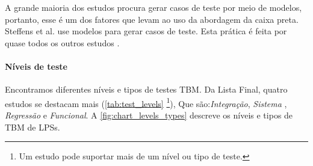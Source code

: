 A grande maioria dos estudos procura gerar casos de teste por meio de modelos, portanto, esse é um dos fatores que levam ao uso da abordagem da caixa preta. Steffens et al. \cite{Steffens_et_al2012} use modelos para gerar casos de teste. Esta prática é feita por quase todos os outros estudos \cite{cichos2011model, oster2011pairwise, samih2014deriving, lackner2014model, Garcia_et_al2010}.


\paragraph{\textbf{Níveis de teste}}

Encontramos diferentes níveis e tipos de testes TBM. Da Lista Final, quatro estudos se destacam mais (\ref{tab:test_levels} \footnote{Um estudo pode suportar mais de um nível ou tipo de teste.}), Que são:\textit{Integração}, \textit{Sistema }, \textit{Regressão} e \textit{Funcional}. A \ref{fig:chart_levels_types} descreve os níveis e tipos de TBM de LPSs.

